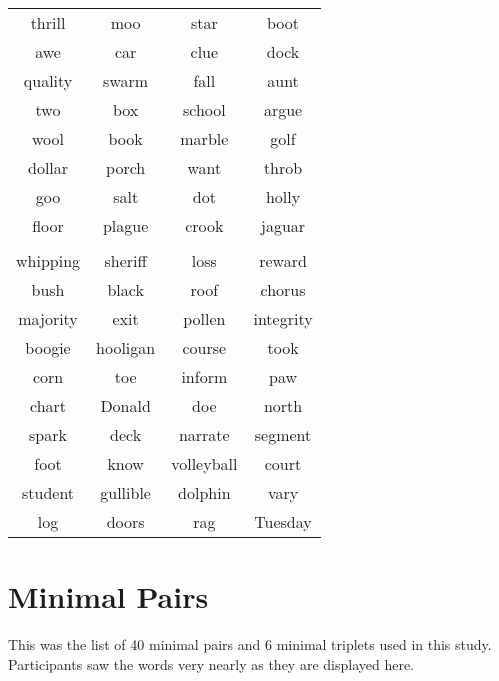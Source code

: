 \begin{table}[h]
{\begin{tabular}{c c c c}
            thrill     & moo    & star   & boot \\
            awe        & car    & clue   & dock \\
            quality    & swarm  & fall   & aunt \\
            two        & box    & school & argue \\
            wool       & book   & marble & golf \\
            dollar     & porch  & want   & throb \\
            goo        & salt   & dot    & holly \\
            floor      & plague & crook  & jaguar \\
            \\
            whipping   & sheriff  & loss       & reward \\
            bush       & black    & roof       & chorus \\
            majority   & exit     & pollen     & integrity \\
            boogie     & hooligan & course     & took \\
            corn       & toe      & inform     & paw \\
            chart      & Donald   & doe        & north \\
            spark      & deck     & narrate    & segment \\
            foot       & know     & volleyball & court \\
            student    & gullible & dolphin    & vary \\
            log        & doors    & rag        & Tuesday
        \end{tabular}
    }
    \label{tab:wordlist}
\end{table}





\newpage
\section{Minimal Pairs}
\label{appendix:minimal_pairs}

This was the list of 40 minimal pairs and 6 minimal triplets used in this study. Participants saw the words very nearly as they are displayed here.

